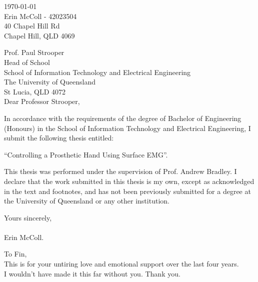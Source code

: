 \documentclass[12pt,openany,a4paper]{book}
\renewcommand{\baselinestretch}{1.2}	%
\begin{document}
\begin{flushright}
	\today\\
	Erin McColl - 42023504\\
	40 Chapel Hill Rd\\
	Chapel Hill, QLD 4069\\
	\medskip
	
\end{flushright}
\begin{flushleft}
  Prof. Paul Strooper\\
  Head of School\\
  School of Information Technology and Electrical Engineering\\
  The University of Queensland\\
  St Lucia, QLD 4072\\
  \bigskip\bigskip
  Dear Professor Strooper,\\
\end{flushleft}
In accordance with the requirements of the degree of Bachelor of Engineering (Honours) in the School of Information Technology and Electrical Engineering, I submit the following thesis entitled: 
\begin{center}
	``Controlling a Prosthetic Hand Using Surface EMG''.\\ 
\end{center}
This thesis was performed under the supervision of Prof. Andrew Bradley. I declare that the work submitted in this thesis is my own, except as acknowledged in the text and footnotes, and has not been previously submitted for a degree at the University of Queensland or any other institution.



\begin{flushleft}
	\medskip
	Yours sincerely,\\
	\bigskip
	\emph\\
	\bigskip
	Erin McColl.
\end{flushleft}

\cleardoublepage
\vspace*{70mm}
\begin{center}
\renewcommand{\baselinestretch}{1.0}
\sl
	

	To Fin,\\
	This is for your untiring love and emotional support over the last four years.\\
	I wouldn't have made it this far without you. Thank you. 


\end{center}
\end{document}

